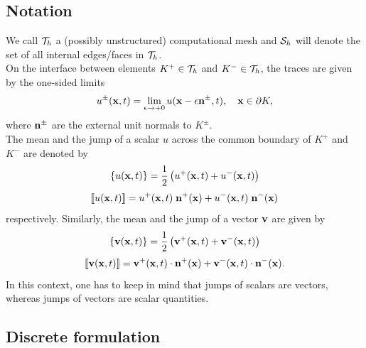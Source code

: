 \documentclass[mathserif]{beamer}
\begin{document}
\subsection{Notation}
\begin{frame}

We call ${\cal T}_h$ a (possibly unstructured) computational mesh 
and ${\cal S}_h$ will denote the set of all internal edges/faces in ${\cal T}_h$.\ \\
On the interface between elements $K^+\in{\cal T}_h$ and $K^-\in{\cal T}_h$,
the traces are given by the one-sided limits
\vspace{-2mm}
$$
u^\pm(\mathbf{x},t)=\lim\limits_{\epsilon\to + 0}u(\mathbf{x}
-\mathbf{\epsilon}\mathbf{n}^{\pm},t),\quad \mathbf{x}\in\partial K,
$$
\vspace{2mm}
where $\mathbf{n}^{\pm}$ are the external unit normals to $K^{\pm}$.\ \\
\vspace{-2mm}
The mean and the jump of a scalar $u$ across the common boundary of $K^+$
and $K^-$ are denoted by
\vspace{-3mm}
\[
\{u(\mathbf{x}, t)\} = \frac 12 \left( u^+(\mathbf{x}, t) + u^-(\mathbf{x}, t) \right)
\]
\vspace{-6mm}
\[
[\![u(\mathbf{x}, t)]\!] =  u^+(\mathbf{x}, t) \; \mathbf{n}^+(\mathbf{x}) + u^-(\mathbf{x}, t) \; \mathbf{n}^-(\mathbf{x}) 
\]
respectively.
Similarly, the mean and the jump of a vector $\mathbf{v}$ are given by
\vspace{-3mm}
\[
\{\mathbf{v}(\mathbf{x}, t)\} = \frac 12 \left( \mathbf{v}^+(\mathbf{x}, t) + \mathbf{v}^-(\mathbf{x}, t) \right)
\]
\vspace{-6mm}
\[
[\![\mathbf{v}(\mathbf{x}, t)]\!] = 
\mathbf{v}^+(\mathbf{x}, t) \cdot \mathbf{n}^+(\mathbf{x}) + \mathbf{v}^-(\mathbf{x}, t) \cdot \mathbf{n}^-(\mathbf{x}).
\]
In this context, one has to keep in mind that jumps of scalars are vectors, whereas 
jumps of vectors are scalar quantities.
\end{frame}



\subsection{Discrete formulation}
\end{document}
